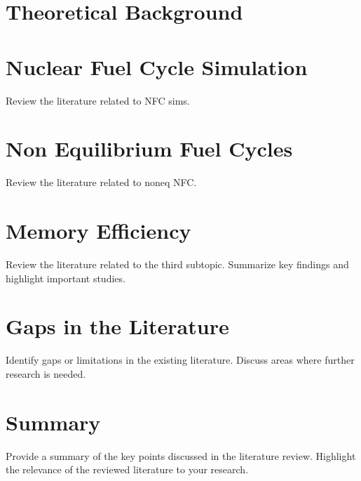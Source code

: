
\section{Theoretical Background}


\section{Nuclear Fuel Cycle Simulation}
Review the literature related to NFC sims.

\section{Non Equilibrium Fuel Cycles}
Review the literature related to noneq NFC.

\section{Memory Efficiency}
Review the literature related to the third subtopic. Summarize key findings and highlight important studies.

\section{Gaps in the Literature}
Identify gaps or limitations in the existing literature. Discuss areas where further research is needed.

\section{Summary}
Provide a summary of the key points discussed in the literature review. Highlight the relevance of the reviewed literature to your research.
